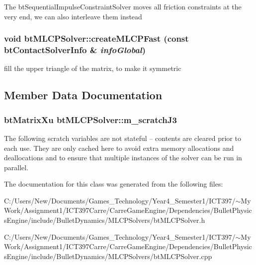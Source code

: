 The btSequentialImpulseConstraintSolver moves all friction constraints at the very end, we can also interleave them instead \hypertarget{classbt_m_l_c_p_solver_b36b9b3bf2bbbd1de7db27ba109e0a8a}{
\subsubsection[createMLCPFast]{\setlength{\rightskip}{0pt plus 5cm}void btMLCPSolver::createMLCPFast (const btContactSolverInfo \& {\em infoGlobal})}}
\label{classbt_m_l_c_p_solver_b36b9b3bf2bbbd1de7db27ba109e0a8a}




fill the upper triangle of the matrix, to make it symmetric 

\subsection{Member Data Documentation}
\hypertarget{classbt_m_l_c_p_solver_8430698267e9572498e04e8dba3cda3b}{
\subsubsection[m\_\-scratchJ3]{\setlength{\rightskip}{0pt plus 5cm}btMatrixXu {\bf btMLCPSolver::m\_\-scratchJ3}}}
\label{classbt_m_l_c_p_solver_8430698267e9572498e04e8dba3cda3b}


The following scratch variables are not stateful -- contents are cleared prior to each use. They are only cached here to avoid extra memory allocations and deallocations and to ensure that multiple instances of the solver can be run in parallel. 

The documentation for this class was generated from the following files:\begin{CompactItemize}
\item 
C:/Users/New/Documents/Games\_\-Technology/Year4\_\-Semester1/ICT397/$\sim$My Work/Assignment1/ICT397Carre/CarreGameEngine/Dependencies/BulletPhysicsEngine/include/BulletDynamics/MLCPSolvers/btMLCPSolver.h\item 
C:/Users/New/Documents/Games\_\-Technology/Year4\_\-Semester1/ICT397/$\sim$My Work/Assignment1/ICT397Carre/CarreGameEngine/Dependencies/BulletPhysicsEngine/include/BulletDynamics/MLCPSolvers/btMLCPSolver.cpp\end{CompactItemize}
